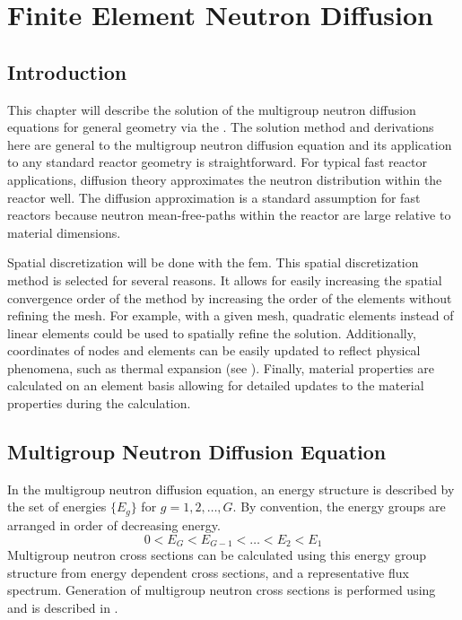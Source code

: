 \chapter{Finite Element Neutron Diffusion}
\label{ch:neutronDiffusion}

\section{Introduction}
  This chapter will describe the solution of the multigroup neutron diffusion
  equations for general geometry via the . The solution method
  and derivations here are general to the multigroup neutron diffusion equation
  and its application to any standard reactor geometry is straightforward. For
  typical fast reactor applications, diffusion theory approximates the neutron
  distribution within the reactor well. The diffusion approximation is a
  standard assumption for fast reactors because neutron mean-free-paths within
  the reactor are large relative to material dimensions.

  Spatial discretization will be done with the \gls{fem}. This spatial 
  discretization method is selected for several reasons. It allows for easily 
  increasing the spatial convergence order of the method by increasing the order
  of the elements without refining the mesh. For example, with a given mesh, 
  quadratic elements instead of linear elements could be used to spatially 
  refine the solution. Additionally, coordinates of nodes and elements can be 
  easily updated to reflect physical phenomena, such as thermal expansion (see 
  ). Finally, material properties are calculated on 
  an element basis allowing for detailed updates to the material properties 
  during the calculation.

\section{Multigroup Neutron Diffusion Equation}
  In the multigroup neutron diffusion equation, an energy structure is 
  described by the set of energies $\{E_g\}$ for $g = 1,2,\ldots,G$.
  By convention, the energy groups are arranged in order of decreasing energy.
  \begin{equation}
    0 < E_G < E_{G-1} < \ldots < E_2 < E_1
  \end{equation}
  Multigroup neutron cross sections can be calculated using this energy group 
  structure from energy dependent cross sections, and a representative flux
  spectrum. Generation of multigroup neutron cross sections is performed using
  \mcc and is described in .

